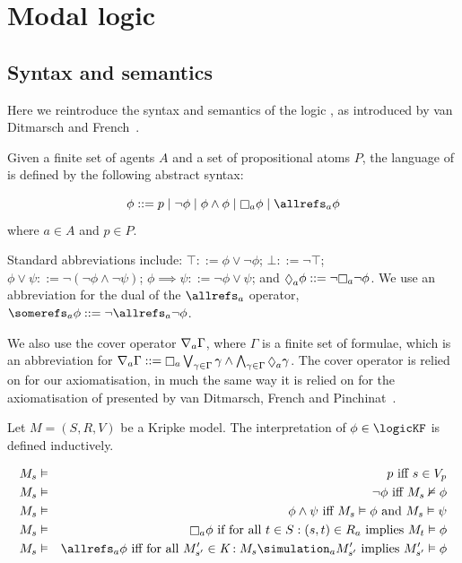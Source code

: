 \chapter{Modal logic}

\section{Syntax and semantics}

Here we reintroduce the syntax and semantics of the logic \logicKF{}, as
introduced by van Ditmarsch and French~\cite{french2009simulation}.


\begin{definition} %
Given a finite set of agents $A$ and a set of propositional atoms $P$, the
language of \langF{} is defined by the following abstract syntax:

$$
\phi ::=    p \bnfalt
            \neg \phi \bnfalt
            \phi \land \phi \bnfalt
            \knows_a \phi \bnfalt
            \allrefs_a \phi
$$
where $a \in A$ and $p \in P$.
\end{definition}

Standard abbreviations include:
$\top ::= \phi \lor \neg \phi$;
$\bot ::= \neg \top$;
$\phi \lor \psi ::= \neg (\neg \phi \land \neg \psi)$;
$\phi \implies \psi ::= \neg \phi \lor \psi$;
and $\suspects_a \phi ::= \neg \knows_a \neg \phi$.
We use an abbreviation for the dual of the $\allrefs_a$ operator,
$\somerefs_a \phi ::= \neg \allrefs_a \neg \phi$.

We also use the cover operator $\nabla_a \Gamma$, where $\Gamma$ is a finite
set of formulae, which is an abbreviation for 
$\covers_a \Gamma ::= \knows_a \bigvee_{\gamma \in \Gamma} \gamma \land
\bigwedge_{\gamma \in \Gamma} \suspects_a \gamma$. The cover operator is relied
on for our axiomatisation, in much the same way it is relied on for the
axiomatisation of \logicKiF{} presented by van Ditmarsch, French and
Pinchinat~\cite{french2010future}. %

\begin{definition}
Let $M = (S, R, V)$ be a Kripke model. The interpretation of $\phi \in
\logicKF$ is defined inductively.

\begin{eqnarray*}
M_s &\entails& p \text{ iff } s \in V_p\\
M_s &\entails& \neg \phi \text{ iff } M_s \nentails \phi\\
M_s &\entails& \phi \land \psi \text{ iff } M_s \entails \phi \text{ and } M_s
\entails \psi\\
M_s &\entails& \knows_a \phi \text{ if for all } t \in S : (s, t) \in R_a \text{
implies } M_t \entails \phi\\
M_s &\entails& \allrefs_a \phi \text{ iff for all } M'_{s'} \in \classK : M_s
\simulation_a M'_{s'} \text{ implies } M'_{s'} \entails \phi\\
\end{eqnarray*}
\end{definition}

